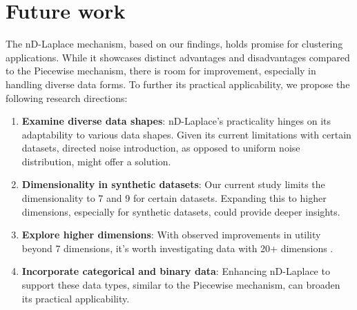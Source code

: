 \section{Future work}
The nD-Laplace mechanism, based on our findings, holds promise for clustering applications. While it showcases distinct advantages and disadvantages compared to the Piecewise mechanism, there is room for improvement, especially in handling diverse data forms. To further its practical applicability, we propose the following research directions:

\begin{enumerate}
\item \textbf{Examine diverse data shapes}: nD-Laplace's practicality hinges on its adaptability to various data shapes. Given its current limitations with certain datasets, directed noise introduction, as opposed to uniform noise distribution, might offer a solution.
\item \textbf{Dimensionality in synthetic datasets}: Our current study limits the dimensionality to 7 and 9 for certain datasets. Expanding this to higher dimensions, especially for synthetic datasets, could provide deeper insights.
\item \textbf{Explore higher dimensions}: With observed improvements in utility beyond 7 dimensions, it's worth investigating data with 20+ dimensions .
\item \textbf{Incorporate categorical and binary data}: Enhancing nD-Laplace to support these data types, similar to the Piecewise mechanism, can broaden its practical applicability. 
\end{enumerate}

